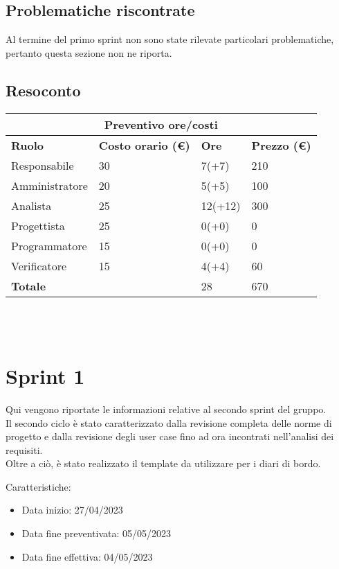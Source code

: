 \documentclass[12pt]{article}
\begin{document}
\subsection{Problematiche riscontrate}
Al termine del primo sprint non sono state rilevate particolari problematiche, pertanto questa sezione non ne riporta.
\subsection{Resoconto}
\begin{center}
    \begin{tabularx}{\textwidth}{|X|X|X|X|}
        \hline
        \multicolumn{4}{|c|}{\textbf{Preventivo ore/costi}}\\
        \hline
        \hline
        \textbf{Ruolo} & \textbf{Costo orario (\euro)} & \textbf{Ore} & \textbf{Prezzo (\euro)}\\
        \hline
        Responsabile    & 30 & 7(+7)  & 210\\
        \hline
        Amministratore  & 20 & 5(+5)  & 100\\
        \hline
        Analista        & 25 & 12(+12)  & 300\\  
        \hline
        Progettista     & 25 & 0(+0)  & 0\\
        \hline
        Programmatore   & 15 & 0(+0)  & 0\\
        \hline
        Verificatore    & 15 & 4(+4)  & 60\\
        \hline
        \hline
        \textbf{Totale} &    & 28 & 670\\
        \hline
    \end{tabularx}\\[8pt]
    \mbox{}\\
\end{center}


\section{Sprint 1}
Qui vengono riportate le informazioni relative al secondo sprint del gruppo. \\
Il secondo ciclo è stato caratterizzato dalla revisione completa delle norme di progetto e dalla revisione degli user case fino ad ora incontrati nell'analisi dei requisiti.\\
Oltre a ciò, è stato realizzato il template da utilizzare per i diari di bordo.


Caratteristiche:
\begin{itemize}
    \item Data inizio: 27/04/2023
    \item Data fine preventivata: 05/05/2023
    \item Data fine effettiva: 04/05/2023
\end{itemize}
\end{document}
